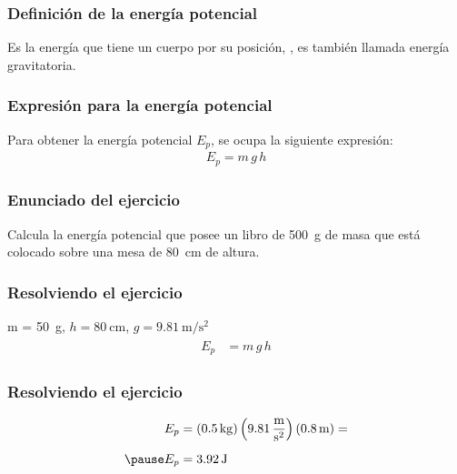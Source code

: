 \documentclass[14pt]{beamer}
\begin{document}
\begin{frame}
\frametitle{Definición de la energía potencial}
Es la energía que tiene un cuerpo por su posición, , es también llamada energía gravitatoria.
\end{frame}
\begin{frame}
\frametitle{Expresión para la energía potencial}
Para obtener la energía potencial $E_{p}$, se ocupa la siguiente expresión:
\pause
\begin{align*}
E_{p} = m \, g \, h
\end{align*}
\end{frame}
\begin{frame}
\frametitle{Enunciado del ejercicio}
Calcula la energía potencial que posee un libro de \SI{500}{\gram} de masa que está colocado sobre una mesa de \SI{80}{\centi\meter} de altura.
\end{frame}
\begin{frame}
\frametitle{Resolviendo el ejercicio}
 \pause m = \SI{50}{\gram}, \pause \hspace{0.5cm} $h = \SI{80}{\centi\meter}$, \pause \hspace{0.5cm} $g = \SI{9.81}{\meter\per\square\second}$
\\
\bigskip
\pause
{}
\begin{eqnarray*}
\begin{aligned}
E_{p} &= m \, g \, h
\end{aligned}
\end{eqnarray*}
\end{frame}
\begin{frame}
\frametitle{Resolviendo el ejercicio}
\pause
\begin{eqnarray*}
\begin{aligned}
E_{p} &= (\SI{0.5}{\kilo\gram}) \left( \SI[per-mode=fraction]{9.81}{\meter\per\square\second} \right) (\SI{0.8}{\meter}) = \\[0.5em] \pause
E_{p} &= \SI{3.92}{\joule}
\end{aligned}
\end{eqnarray*}
\end{frame}
\end{document}

